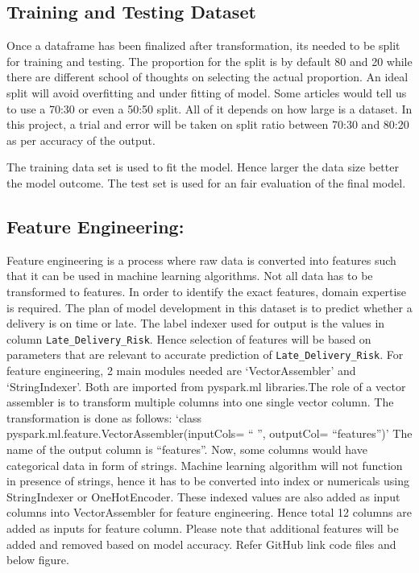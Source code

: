 \documentclass[journal,twoside,web]{ieeecolor}
\begin{document}
\subsection{Training and Testing Dataset}
Once a dataframe has been finalized after transformation, its needed to be split for training and testing. The proportion for the split is by default 80 \text {\%} and 20 \text{\%,}  while there are different school of thoughts on selecting the actual proportion.
An ideal split will avoid overfitting and under fitting of model. Some articles would tell us to use a 70:30 or even a 50:50 split. All of it depends on how large is a dataset. In this project, a trial and error will be taken on split ratio between 70:30 and 80:20 as per accuracy of the output. 

The training data set is used to fit the model. Hence larger the data size better the model outcome. The test set is used for an fair evaluation of the final model.

\subsection{Feature Engineering:}
Feature engineering is a process where raw data is converted into features such that it can be used in machine learning algorithms. Not all data has to be transformed to features. In order to identify the exact features, domain expertise is required. The plan of model development in this dataset is to predict whether a delivery is on time or late. The label indexer used for output is the values in column \texttt{Late\_Delivery\_Risk}.
Hence selection of features will be based on parameters that are relevant to accurate prediction of \texttt{Late\_Delivery\_Risk}. 
For feature engineering, 2 main modules needed are ‘VectorAssembler’ and ‘StringIndexer’. Both are imported from pyspark.ml libraries.The role of a vector assembler is to transform multiple columns into one single vector column.
The transformation is done as follows:
‘class pyspark.ml.feature.VectorAssembler(inputCols= “ ”, outputCol= “features”)’
The name of the output column is “features”. Now, some columns would have categorical data in form of strings. Machine learning algorithm will not function in presence of strings, hence it has to be converted into index or numericals using StringIndexer or OneHotEncoder. These indexed values are also added as input columns into VectorAssembler for feature engineering. Hence total 12 columns are added as inputs for feature column. Please note that additional features will be added and removed based on model accuracy. Refer GitHub link code files and below figure. 
\end{document}
